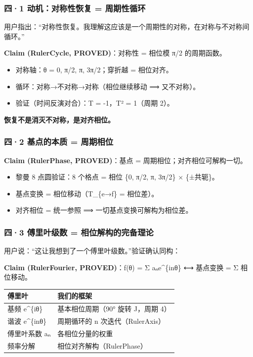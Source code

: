 \documentclass[
]{article}
\providecommand{\tightlist}{%
  \setlength{\itemsep}{0pt}\setlength{\parskip}{0pt}}
\begin{document}
\subsubsection{四·1 动机：对称性恢复 =
周期性循环}\label{ux56db1-ux52a8ux673aux5bf9ux79f0ux6027ux6062ux590d-ux5468ux671fux6027ux5faaux73af}

用户指出：``对称性恢复。我理解这应该是一个周期性的对称，在对称与不对称间循环。''

\textbf{Claim (RulerCycle, PROVED)}：对称性 = 相位模 π/2 的周期函数。

\begin{itemize}
\tightlist
\item
  对称轴：θ = 0, π/2, π, 3π/2；穿折越 = 相位对齐。
\item
  循环：对称→不对称→对称（相位继续移动 ⟹ 又不对称）。
\item
  验证（时间反演对合）：T = -1，T² = 1（周期 2）。
\end{itemize}

\textbf{恢复不是消灭不对称，是对齐相位。}

\subsubsection{四·2 基点的本质 =
周期相位}\label{ux56db2-ux57faux70b9ux7684ux672cux8d28-ux5468ux671fux76f8ux4f4d}

\textbf{Claim (RulerPhase, PROVED)}：基点 =
周期相位；对齐相位可解构一切。

\begin{itemize}
\tightlist
\item
  黎曼 8 点圆验证：8 个格点 = 相位 \{0, π/2, π, 3π/2\} × \{±共轭\}。
\item
  基点变换 = 相位移动（T\_\{e→f\} = 相位差）。
\item
  对齐相位 = 统一参照 ⟹ 一切基点变换可解构为相位差。
\end{itemize}

\subsubsection{四·3 傅里叶级数 =
相位解构的完备理论}\label{ux56db3-ux5085ux91ccux53f6ux7ea7ux6570-ux76f8ux4f4dux89e3ux6784ux7684ux5b8cux5907ux7406ux8bba}

用户说：``这让我想到了一个傅里叶级数。''验证确认同构：

\textbf{Claim (RulerFourier, PROVED)}：f(θ) = Σ aₙe\^{}\{inθ\} ⟷
基点变换 = Σ 相位移动。

\begin{longtable}[]{@{}ll@{}}
\toprule\noalign{}
傅里叶 & 我们的框架 \\
\midrule\noalign{}
\endhead
\bottomrule\noalign{}
\endlastfoot
基频 e\^{}\{iθ\} & 基本相位周期（90° 旋转 J，周期 4） \\
谐波 e\^{}\{inθ\} & 周期循环的 n 次迭代（RulerAxis） \\
傅里叶系数 aₙ & 各相位分量的权重 \\
频率分解 & 相位对齐解构（RulerPhase） \\
\end{longtable}
\end{document}
